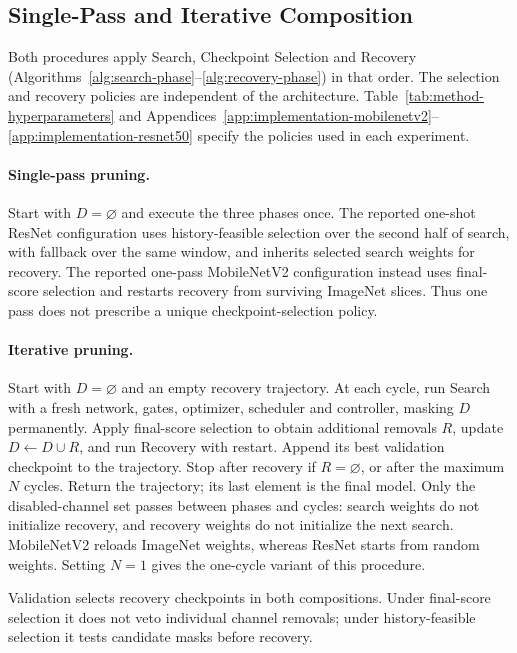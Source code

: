 \subsection{Single-Pass and Iterative Composition}
\label{sec:iterative-method}

Both procedures apply Search, Checkpoint Selection and Recovery
(Algorithms~\ref{alg:search-phase}--\ref{alg:recovery-phase}) in that order.
The selection and recovery policies are independent of the architecture.
Table~\ref{tab:method-hyperparameters} and
Appendices~\ref{app:implementation-mobilenetv2}--\ref{app:implementation-resnet50}
specify the policies used in each experiment.

\paragraph{Single-pass pruning.}
Start with $D=\varnothing$ and execute the three phases once.
The reported one-shot ResNet configuration uses history-feasible
selection over the second half of search, with fallback over the same
window, and inherits selected search weights for recovery.
The reported one-pass MobileNetV2 configuration instead uses final-score
selection and restarts recovery from surviving ImageNet slices.
Thus one pass does not prescribe a unique checkpoint-selection policy.

\paragraph{Iterative pruning.}
Start with $D=\varnothing$ and an empty recovery trajectory. At each cycle,
run Search with a fresh network, gates, optimizer, scheduler and controller,
masking $D$ permanently. Apply final-score selection to obtain additional
removals $R$, update $D\gets D\cup R$, and run Recovery with restart.
Append its best validation checkpoint to the trajectory. Stop after
recovery if $R=\varnothing$, or after the maximum $N$ cycles.
Return the trajectory; its last element is the final model.
Only the disabled-channel set passes between phases and cycles:
search weights do not initialize recovery, and recovery weights do not
initialize the next search. MobileNetV2 reloads ImageNet weights, whereas
ResNet starts from random weights. Setting $N=1$ gives the one-cycle
variant of this procedure.

Validation selects recovery checkpoints in both compositions. Under
final-score selection it does not veto individual channel removals;
under history-feasible selection it tests candidate masks before recovery.
